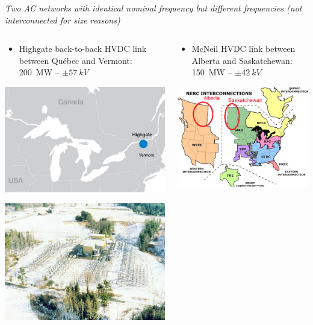 \begin{frame}
\textit{Two AC networks with identical nominal frequency but different frequencies (not interconnected for size reasons)}
\begin{columns}
\begin{column}{0.5\linewidth}
\begin{itemize}
    \item Highgate back-to-back HVDC link between Québec and Vermont: \SI{200}{MW} -- $\pm \SI{57}{kV}$
\end{itemize}
\begin{center}
    \includegraphics[width=0.5\linewidth]{images/highgate.png}
\end{center}
\begin{center}
    \includegraphics[width=0.5\linewidth]{images/highgate2.png}
\end{center}
\end{column}
\begin{column}{0.5\linewidth}
\begin{itemize}
    \item McNeil HVDC link between Alberta and Saskatchewan: \SI{150}{MW} -- $\pm \SI{42}{kV}$
\end{itemize}
\begin{center}
    \includegraphics[width=0.7\linewidth]{images/usa.png}
\end{center}
\end{column}
\end{columns}
\end{frame}


